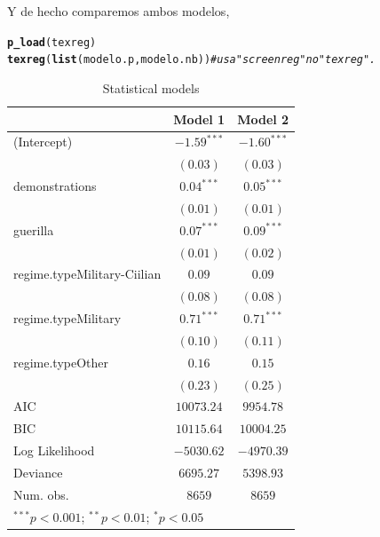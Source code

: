 \documentclass[onesided]{article}\usepackage[]{graphicx}\usepackage[]{color}
\makeatletter
\newcommand{\hlcom}[1]{\textcolor[rgb]{0.678,0.584,0.686}{\textit{#1}}}%
\newcommand{\hlstd}[1]{\textcolor[rgb]{0.345,0.345,0.345}{#1}}%
\newcommand{\hlkwd}[1]{\textcolor[rgb]{0.737,0.353,0.396}{\textbf{#1}}}%
\newenvironment{kframe}{%
 \def\at@end@of@kframe{}%
 \ifinner\ifhmode%
  \def\at@end@of@kframe{\end{minipage}}%
  \begin{minipage}{\columnwidth}%
 \fi\fi%
 \def\FrameCommand##1{\hskip\@totalleftmargin \hskip-\fboxsep
 \colorbox{shadecolor}{##1}\hskip-\fboxsep
     \hskip-\linewidth \hskip-\@totalleftmargin \hskip\columnwidth}%
 \MakeFramed {\advance\hsize-\width
   \@totalleftmargin\z@ \linewidth\hsize
   \@setminipage}}%
 {\par\unskip\endMakeFramed%
 \at@end@of@kframe}
\makeatother
\begin{document}
Y de hecho comparemos ambos modelos,

\begin{kframe}
\begin{alltt}
\hlkwd{p_load}\hlstd{(texreg)}
\hlkwd{texreg}\hlstd{(}\hlkwd{list}\hlstd{(modelo.p, modelo.nb))} \hlcom{# usa "screenreg" no "texreg".}
\end{alltt}
\end{kframe}
\begin{table}
\begin{center}
\begin{tabular}{l c c}
\hline
 & Model 1 & Model 2 \\
\hline
(Intercept)                 & $-1.59^{***}$ & $-1.60^{***}$ \\
                            & $(0.03)$      & $(0.03)$      \\
demonstrations              & $0.04^{***}$  & $0.05^{***}$  \\
                            & $(0.01)$      & $(0.01)$      \\
guerilla                    & $0.07^{***}$  & $0.09^{***}$  \\
                            & $(0.01)$      & $(0.02)$      \\
regime.typeMilitary-Ciilian & $0.09$        & $0.09$        \\
                            & $(0.08)$      & $(0.08)$      \\
regime.typeMilitary         & $0.71^{***}$  & $0.71^{***}$  \\
                            & $(0.10)$      & $(0.11)$      \\
regime.typeOther            & $0.16$        & $0.15$        \\
                            & $(0.23)$      & $(0.25)$      \\
\hline
AIC                         & $10073.24$    & $9954.78$     \\
BIC                         & $10115.64$    & $10004.25$    \\
Log Likelihood              & $-5030.62$    & $-4970.39$    \\
Deviance                    & $6695.27$     & $5398.93$     \\
Num. obs.                   & $8659$        & $8659$        \\
\hline
\multicolumn{3}{l}{\scriptsize{$^{***}p<0.001$; $^{**}p<0.01$; $^{*}p<0.05$}}
\end{tabular}
\caption{Statistical models}
\label{table:coefficients}
\end{center}
\end{table}
\end{document}
